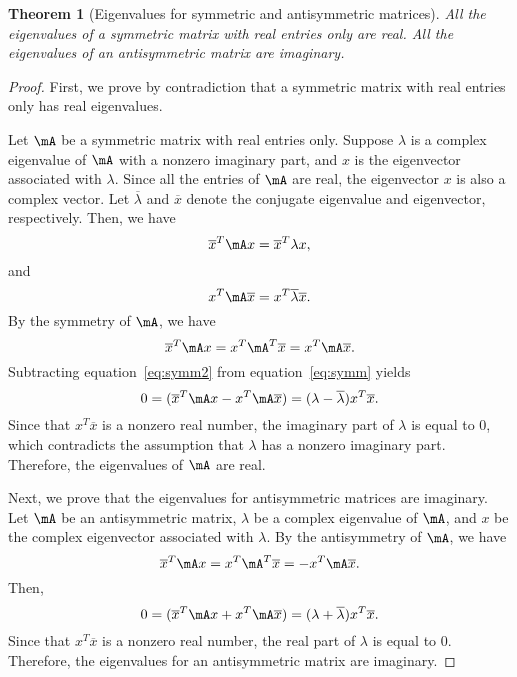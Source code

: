 \documentclass[11pt]{article}
\theoremstyle{plain}
\newtheorem{thm}{Theorem}[section]
\theoremstyle{definition}
\begin{document}
\begin{thm}[Eigenvalues for symmetric and antisymmetric matrices]\label{thm:symmeign}
All the eigenvalues of a symmetric matrix with real entries only are real. All the eigenvalues of an antisymmetric matrix are imaginary.
\end{thm}
\begin{proof}
	First, we prove by contradiction that a symmetric matrix with real entries only has real eigenvalues. 
	
	Let  $\mA$  be a symmetric  matrix with real entries only. Suppose $\lambda$  is a complex eigenvalue of $\mA$ with  a nonzero imaginary part, and $x$ is the eigenvector associated with $\lambda$. Since all the entries of $\mA$ are real, the eigenvector $x$ is also a complex vector. Let $\overline \lambda$ and $\overline x$ denote the conjugate eigenvalue and eigenvector, respectively. Then,  we have
	\begin{equation}\label{eq:symm}
		\overline x^T \mA x = \overline x^T \lambda x,
	\end{equation} 
	and
	\begin{equation}\label{eq:symm2}
		x^T \mA \overline x = x^T \overline \lambda \overline x.
	\end{equation}
	 By the symmetry of $\mA$, we have
	\[ \overline x^T \mA x  = x^T \mA^T \overline x = x^T \mA \overline x .\] 
	 Subtracting equation~\eqref{eq:symm2} from equation~\eqref{eq:symm} yields	\[  0 = ( \overline x^T \mA x -  x^T \mA \overline x ) = (\lambda - \overline \lambda) x^T \overline x.  \]
	Since that $x^T \overline x$ is a nonzero real number, the imaginary part of $\lambda$ is equal to 0, which contradicts the assumption that $\lambda$ has a nonzero imaginary part. Therefore, the eigenvalues of $\mA$ are real.
	
	\vspace{0.2cm}
	Next, we prove that the eigenvalues for antisymmetric matrices are imaginary. 
	Let $\mA$ be an antisymmetric matrix,  $\lambda$ be a complex eigenvalue of $\mA$, and $x$ be the complex eigenvector associated with $\lambda$. By the antisymmetry of $\mA$, we have
	\[ \overline x^T \mA x  = x^T \mA^T \overline x  =  -x^T \mA \overline x .  \] 
	Then, 
	\[  0 = ( \overline x^T \mA x +  x^T \mA \overline x ) = (\lambda + \overline \lambda) x^T \overline x.   \]
	Since that $x^T \overline x$ is a nonzero real number, the real part of $\lambda$ is equal to 0. Therefore, the eigenvalues for an antisymmetric matrix are imaginary.
\end{proof}
\end{document}
